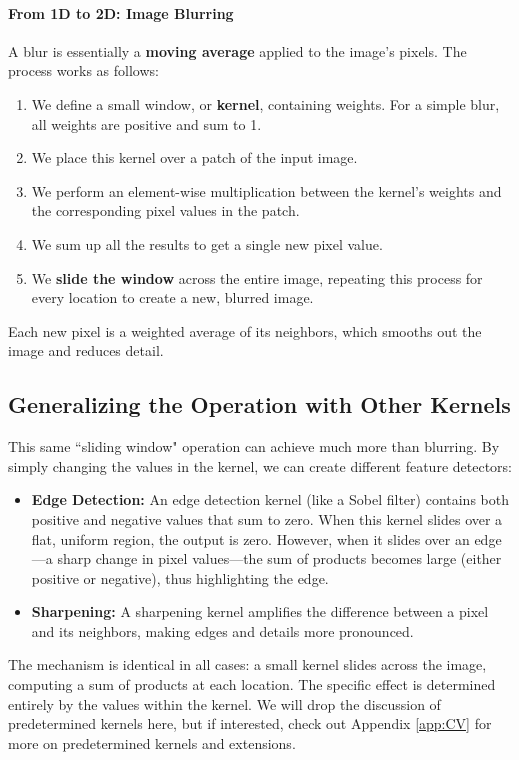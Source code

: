 \documentclass{article}
\begin{document}
\paragraph{From 1D to 2D: Image Blurring}

A blur is essentially a \textbf{moving average} applied to the image's pixels. The process works as follows:
\begin{enumerate}
    \item We define a small window, or \textbf{kernel}, containing weights. For a simple blur, all weights are positive and sum to 1.
    \item We place this kernel over a patch of the input image.
    \item We perform an element-wise multiplication between the kernel's weights and the corresponding pixel values in the patch.
    \item We sum up all the results to get a single new pixel value.
    \item We \textbf{slide the window} across the entire image, repeating this process for every location to create a new, blurred image.
\end{enumerate}
Each new pixel is a weighted average of its neighbors, which smooths out the image and reduces detail.

\subsection{Generalizing the Operation with Other Kernels}
This same ``sliding window" operation can achieve much more than blurring. By simply changing the values in the kernel, we can create different feature detectors:
\begin{itemize}
    \item \textbf{Edge Detection:} An edge detection kernel (like a Sobel filter) contains both positive and negative values that sum to zero. When this kernel slides over a flat, uniform region, the output is zero. However, when it slides over an edge—a sharp change in pixel values—the sum of products becomes large (either positive or negative), thus highlighting the edge.
    \item \textbf{Sharpening:} A sharpening kernel amplifies the difference between a pixel and its neighbors, making edges and details more pronounced.
\end{itemize}
The mechanism is identical in all cases: a small kernel slides across the image, computing a sum of products at each location. The specific effect is determined entirely by the values within the kernel. We will drop the discussion of predetermined kernels here, but if interested, check out Appendix \ref{app:CV} for more on predetermined kernels and extensions.
\end{document}
